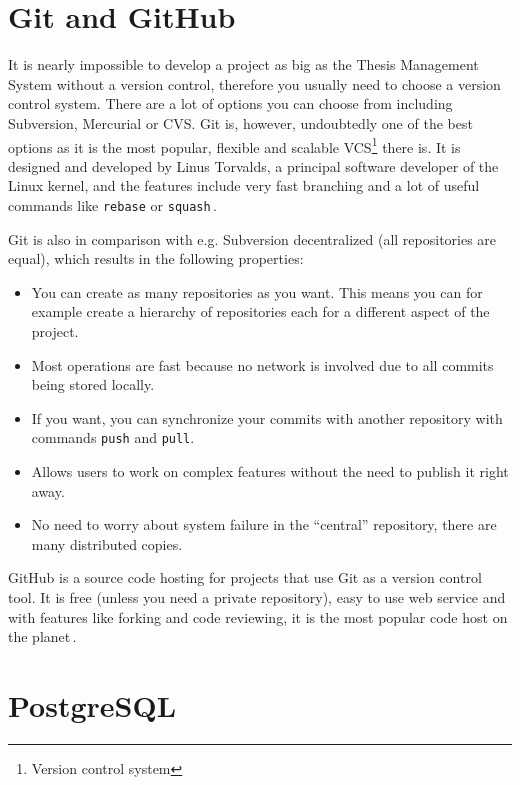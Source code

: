 \section{Git and GitHub}

It is nearly impossible to develop a project as big as the Thesis Management System without a version control, therefore you usually need to choose a version control system. There are a lot of options you can choose from including Subversion, Mercurial or CVS. Git is, however, undoubtedly one of the best options as it is the most popular, flexible and scalable VCS\footnote{Version control system} there is. It is designed and developed by Linus Torvalds, a principal software developer of the Linux kernel, and the features include very fast branching and a lot of useful commands like \texttt{rebase} or \texttt{squash}\,\cite{git-homepage}\cite{pro-git}. 

Git is also in comparison with e.g. Subversion decentralized (all repositories are equal), which results in the following properties:

\begin{itemize}
    \item You can create as many repositories as you want. This means you can for example create a hierarchy of repositories each for a different aspect of the project.
    \item Most operations are fast because no network is involved due to all commits being stored locally. 
    \item If you want, you can synchronize your commits with another repository with commands \texttt{push} and \texttt{pull}. 
    \item Allows users to work on complex features without the need to publish it right away.
    \item No need to worry about system failure in the ``central'' repository, there are many distributed copies.
\end{itemize}

GitHub is a source code hosting for projects that use Git as a version control tool. It is free (unless you need a private repository), easy to use web service and with features like forking and code reviewing, it is the most popular code host on the planet\,\cite{github-features}.

\section{PostgreSQL}

